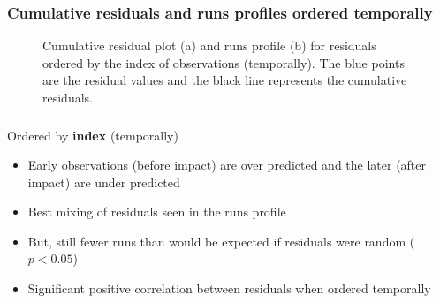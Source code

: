 \begin{frame}[fragile]
\frametitle{Cumulative residuals and runs profiles ordered temporally}  
\begin{figure}[h]
  \centering
  \caption{Cumulative residual plot (a) and runs profile (b) for residuals ordered by the index of observations (temporally).  The blue points are the residual values and the black line represents the cumulative residuals.}
  \label{fig:geeruns3}
\end{figure}
\end{frame}

\begin{frame}[fragile]
\frametitle{}
Ordered by \textbf{index} (temporally)
\begin{itemize}
\item Early observations (before impact) are over predicted and the later (after impact) are under predicted
\item Best mixing of residuals seen in the runs profile 
\item But, still fewer runs than would be expected if residuals were random ($p<0.05$)
\item Significant positive correlation between residuals when ordered temporally
\end{itemize}
\end{frame}

